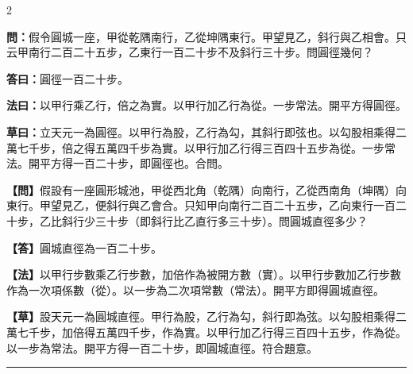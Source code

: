 \documentclass[11pt,a4paper]{article}
\newcommand{\longline}{\noindent\rule{\textwidth}{0.4pt}}
\newcommand{\wenC}[1]{\par\noindent\textbf{\textcolor{probcolor}{問：}}{#1}\par}
\newcommand{\daC}[1]{\par\noindent\textbf{\textcolor{anscolor}{答曰：}}{#1}\par}
\newcommand{\fayueC}[1]{\par\noindent\textbf{\textcolor{methodcolor}{法曰：}}{#1}\par}
\newcommand{\caoyueC}[1]{\par\noindent\textbf{草曰：}{#1}\par}
\newcommand{\wenM}[1]{\par\noindent\textbf{\textcolor{probcolor}{【問】}}{#1}\par}
\newcommand{\daM}[1]{\par\noindent\textbf{\textcolor{anscolor}{【答】}}{#1}\par}
\newcommand{\fayueM}[1]{\par\noindent\textbf{\textcolor{methodcolor}{【法】}}{#1}\par}
\newcommand{\caoyueM}[1]{\par\noindent\textbf{【草】}{#1}\par}
\begin{document}
\begin{paracol}{2}

\wenC{假令圓城一座，甲從乾隅南行，乙從坤隅東行。甲望見乙，斜行與乙相會。只云甲南行二百二十五步，乙東行一百二十步不及斜行三十步。問圓徑幾何？}

\daC{圓徑一百二十步。}

\fayueC{以甲行乘乙行，倍之為實。以甲行加乙行為從。一步常法。開平方得圓徑。}

\caoyueC{立天元一為圓徑。以甲行為股，乙行為勾，其斜行即弦也。以勾股相乘得二萬七千步，倍之得五萬四千步為實。以甲行加乙行得三百四十五步為從。一步常法。開平方得一百二十步，即圓徑也。合問。}

\switchcolumn

\wenM{假設有一座圓形城池，甲從西北角（乾隅）向南行，乙從西南角（坤隅）向東行。甲望見乙，便斜行與乙會合。只知甲向南行二百二十五步，乙向東行一百二十步，乙比斜行少三十步（即斜行比乙直行多三十步）。問圓城直徑多少？}

\daM{圓城直徑為一百二十步。}

\fayueM{以甲行步數乘乙行步數，加倍作為被開方數（實）。以甲行步數加乙行步數作為一次項係數（從）。以一步為二次項常數（常法）。開平方即得圓城直徑。}

\caoyueM{設天元一為圓城直徑。甲行為股，乙行為勾，斜行即為弦。以勾股相乘得二萬七千步，加倍得五萬四千步，作為實。以甲行加乙行得三百四十五步，作為從。以一步為常法。開平方得一百二十步，即圓城直徑。符合題意。}

\end{paracol}

\vspace{0.3cm}
\longline
\end{document}
